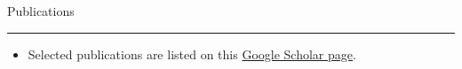 \documentclass[11pt,oneside]{article}
\newenvironment{ressection}[1]{
	{\fontfamily{phv}\selectfont\Large#1}
	
	\vspace{-8pt} \rule{\textwidth}{.5pt}
	
	\vspace{-4pt}
	\begin{itemize}
	\vspace{.5pt}
}{
	\end{itemize}
}
\newcommand{\resitem}[1]{
	\vspace{2pt}
	\item \begin{flushleft} #1 \end{flushleft}
}
\begin{document}
\begin{ressection}{Publications}
    \resitem{Selected publications are listed on this \href{https://scholar.google.com/citations?user=aLLW2YIAAAAJ&hl=en&oi=ao}{Google Scholar page}.}
\begin{comment}
	\resitem{Glove: A Bespoke Website Fingerprinting Defense. \begin{small} Rishab Nithyanand, \textbf{Xiang Cai} and Rob Johnson. \textit{Workshop on Privacy in the Electronic Society, Scottsdale, AZ, November 2014}.
	\end{small}}
	
	\resitem{CS-BuFLO: A Congestion Sensitive Website Fingerprinting Defense. \begin{small} \textbf{Xiang Cai}, Rishab Nithyanand and Rob Johnson. \textit{Workshop on Privacy in the Electronic Society, Scottsdale, AZ, November 2014}.
	\end{small}}
	
	\resitem{A Systematic Approach to Developing and Evaluating Website Fingerprinting Defenses. \begin{small} \textbf{Xiang Cai}, Rishab Nithyanand, Tao Wang, Rob Johnson and Ian Goldberg. \textit{ACM Conference on Computer and Communications Security, Scottsdale, AZ, November 2014}.
	\end{small}}
	
	\resitem{Effective Attacks and Provable Defenses for Website Fingerprinting. \begin{small} Tao Wang \textbf{Xiang Cai}, Rishab Nithyanand, Rob Johnson and Ian Goldberg. \textit{The 23rd USENIX Security Symposium, San Diego, CA, August 2014}.
	\end{small}}

	\resitem{Touching From a Distance: Website Fingerprinting
		Attacks and Defenses. \begin{small} \textbf{Xiang Cai}, Xincheng Zhang
			and Rob Johnson. \textit{ACM Conference on Computer and Communications Security, Raleigh, NC, October 2012}. %
			\end{small}}

	\resitem{Exploiting Unix File-System Races via Algorithmic
		Complexity Attacks. \begin{small} \textbf{Xiang Cai}, Yuwei Gui, and
			Rob Johnson. \textit{IEEE Symposium on Security and Privacy,
				Oakland, CA, May 2009}. 
				\end{small}}
\end{comment}
\end{ressection}
\end{document}
